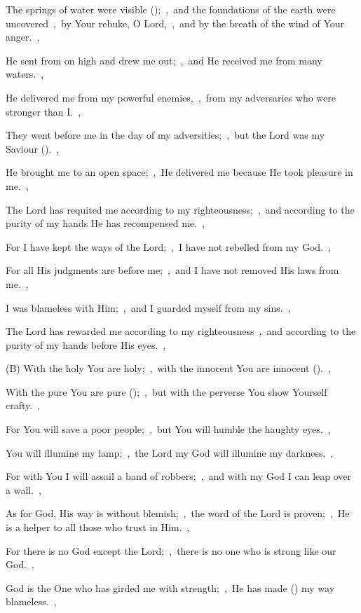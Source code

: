 \documentclass[12pt,twoside,a5paper]{article}
\begin{document}
\begin{normalparskip}
  The springs of water were visible ();~\sep\ and the foundations of the earth were uncovered~\sep\ by Your rebuke, O Lord,~\sep\ and by the breath of the wind of Your anger.~\sep

  He sent from on high and drew me out;~\sep\ and He received me from many waters.~\sep

  He delivered me from my powerful enemies,~\sep\ from my adversaries who were stronger than I.~\sep

  They went before me in the day of my adversities;~\sep\ but the Lord was my Saviour ().~\sep

  He brought me to an open space;~\sep\ He delivered me because He took pleasure in me.~\sep

  The Lord has requited me according to my righteousness;~\sep\ and according to the purity of my hands He has recompensed me.~\sep

  For I have kept the ways of the Lord;~\sep\ I	have not rebelled from my God.~\sep

  For all His judgments are before me;~\sep\ and I have not removed His laws from me.~\sep

  I was blameless with Him;~\sep\ and I guarded myself from my sins.~\sep

  The Lord has rewarded me according to my righteousness~\sep\ and according to the purity of my hands before His eyes.~\sep

  (B) With the holy You are holy;~\sep\ with the innocent You are innocent ().~\sep

  With the pure You are pure ();~\sep\ but with the perverse You show Yourself crafty.~\sep

  For You will save a poor people;~\sep\ but You will humble the haughty eyes.~\sep

  You will illumine my lamp;~\sep\ the Lord my God will illumine my darkness.~\sep

  For with You I will assail a band of robbers;~\sep\ and with my God I can leap over a wall.~\sep

  As for God, His way is without blemish;~\sep\ the word of the Lord is proven;~\sep\ He is a helper to all those who trust in Him.~\sep

  For there is no God except the Lord;~\sep\ there is no one who is strong like our God.~\sep

  God is the One who has girded me with strength;~\sep\ He has made () my way blameless.~\sep


\end{normalparskip}
\end{document}
